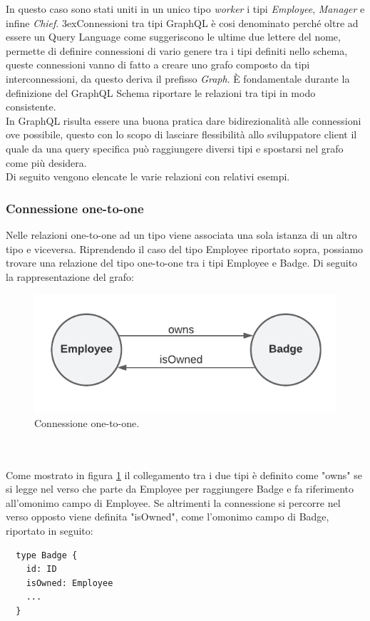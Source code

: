 In questo caso sono stati uniti in un unico tipo \textit{worker} i tipi \textit{Employee}, \textit{Manager} e infine \textit{Chief}.
3ex{Connessioni tra tipi}
GraphQL è cosi denominato perché oltre ad essere un Query Language come suggeriscono le ultime due lettere del nome, permette di definire connessioni di vario genere tra i tipi definiti nello schema, queste connessioni vanno di fatto a creare uno grafo composto da tipi interconnessioni, da questo deriva il prefisso \textit{Graph}.
È fondamentale durante la definizione del GraphQL Schema riportare le relazioni tra tipi in modo consistente. \\
In GraphQL risulta essere una buona pratica dare bidirezionalità alle connessioni ove possibile, questo con lo scopo di lasciare flessibilità allo sviluppatore client il quale da una query specifica può raggiungere diversi tipi e spostarsi nel grafo come più desidera.\\
Di seguito vengono elencate le varie relazioni con relativi esempi.
\subsubsection*{Connessione one-to-one}
Nelle relazioni one-to-one ad un tipo viene associata una sola istanza di un altro tipo e viceversa. Riprendendo il caso del tipo Employee riportato sopra, possiamo trovare una relazione del tipo one-to-one tra i tipi Employee e Badge. Di seguito la rappresentazione del grafo:
\begin{figure}[!h]
\centering
\includegraphics[width=0.5\linewidth]{immagini/one_to_one.pdf}
\caption{Connessione one-to-one.}
\label{one-to-one}
\end{figure}
\\ \\
Come mostrato in figura \ref{one-to-one} il collegamento tra i due tipi è definito come "owns" se si legge nel verso che parte da Employee per raggiungere Badge e fa riferimento all'omonimo campo di Employee. Se altrimenti la connessione si percorre nel verso opposto viene definita "isOwned", come l'omonimo campo di Badge, riportato in seguito:
\begin{verbatim}
  type Badge {
    id: ID
    isOwned: Employee
    ...
  }
\end{verbatim}
